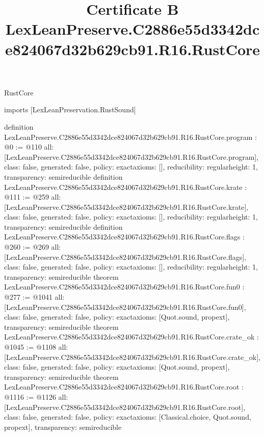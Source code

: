 \begin{lexlean}{RustCore}
\title{Certificate B LexLeanPreserve.C2886e55d3342dce824067d32b629cb91.R16.RustCore}
\begin{coremodule}
imports [LexLeanPreservation.RustSound]

definition LexLeanPreserve.C2886e55d3342dce824067d32b629cb91.R16.RustCore.program : @0 := @110 {
  all: [LexLeanPreserve.C2886e55d3342dce824067d32b629cb91.R16.RustCore.program],
  class: false,
  generated: false,
  policy: exact{axioms: []},
  reducibility: regular{height: 1},
  transparency: semireducible
}
definition LexLeanPreserve.C2886e55d3342dce824067d32b629cb91.R16.RustCore.krate : @111 := @259 {
  all: [LexLeanPreserve.C2886e55d3342dce824067d32b629cb91.R16.RustCore.krate],
  class: false,
  generated: false,
  policy: exact{axioms: []},
  reducibility: regular{height: 1},
  transparency: semireducible
}
definition LexLeanPreserve.C2886e55d3342dce824067d32b629cb91.R16.RustCore.flags : @260 := @269 {
  all: [LexLeanPreserve.C2886e55d3342dce824067d32b629cb91.R16.RustCore.flags],
  class: false,
  generated: false,
  policy: exact{axioms: []},
  reducibility: regular{height: 1},
  transparency: semireducible
}
theorem LexLeanPreserve.C2886e55d3342dce824067d32b629cb91.R16.RustCore.fun0 : @277 := @1041 {
  all: [LexLeanPreserve.C2886e55d3342dce824067d32b629cb91.R16.RustCore.fun0],
  class: false,
  generated: false,
  policy: exact{axioms: [Quot.sound, propext]},
  transparency: semireducible
}
theorem LexLeanPreserve.C2886e55d3342dce824067d32b629cb91.R16.RustCore.crate_ok : @1045 := @1108 {
  all: [LexLeanPreserve.C2886e55d3342dce824067d32b629cb91.R16.RustCore.crate_ok],
  class: false,
  generated: false,
  policy: exact{axioms: [Quot.sound, propext]},
  transparency: semireducible
}
theorem LexLeanPreserve.C2886e55d3342dce824067d32b629cb91.R16.RustCore.root : @1116 := @1126 {
  all: [LexLeanPreserve.C2886e55d3342dce824067d32b629cb91.R16.RustCore.root],
  class: false,
  generated: false,
  policy: exact{axioms: [Classical.choice, Quot.sound, propext]},
  transparency: semireducible
}


\end{coremodule}
\end{lexlean}
